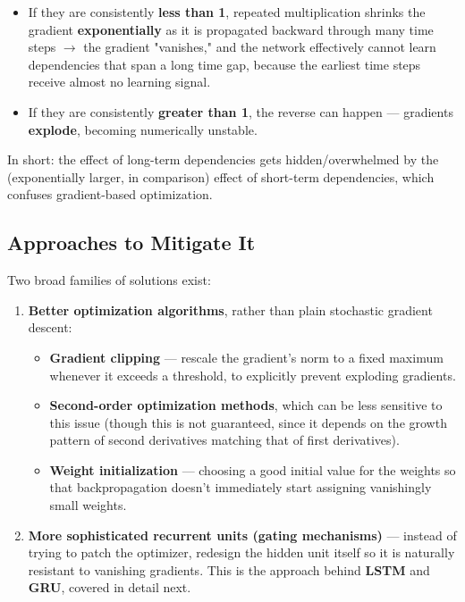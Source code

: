 \documentclass[12pt,openany]{book}
\theoremstyle{definition}
\theoremstyle{remark}
\begin{document}
\begin{itemize}
\item If they are consistently \textbf{less than 1}, repeated multiplication shrinks the gradient \textbf{exponentially} as it is propagated backward through many time steps \ensuremath{\rightarrow} the gradient "vanishes," and the network effectively cannot learn dependencies that span a long time gap, because the earliest time steps receive almost no learning signal.
\item If they are consistently \textbf{greater than 1}, the reverse can happen --- gradients \textbf{explode}, becoming numerically unstable.

\end{itemize}
In short: the effect of long-term dependencies gets hidden/overwhelmed by the (exponentially larger, in comparison) effect of short-term dependencies, which confuses gradient-based optimization.

\subsection{Approaches to Mitigate It}

Two broad families of solutions exist:

\begin{enumerate}
\item \textbf{Better optimization algorithms}, rather than plain stochastic gradient descent:
\begin{itemize}
\item \textbf{Gradient clipping} --- rescale the gradient's norm to a fixed maximum whenever it exceeds a threshold, to explicitly prevent exploding gradients.
\item \textbf{Second-order optimization methods}, which can be less sensitive to this issue (though this is not guaranteed, since it depends on the growth pattern of second derivatives matching that of first derivatives).
\item \textbf{Weight initialization} --- choosing a good initial value for the weights so that backpropagation doesn't immediately start assigning vanishingly small weights.

\end{itemize}
\item \textbf{More sophisticated recurrent units (gating mechanisms)} --- instead of trying to patch the optimizer, redesign the hidden unit itself so it is naturally resistant to vanishing gradients. This is the approach behind \textbf{LSTM} and \textbf{GRU}, covered in detail next.

\end{enumerate}
\end{document}

